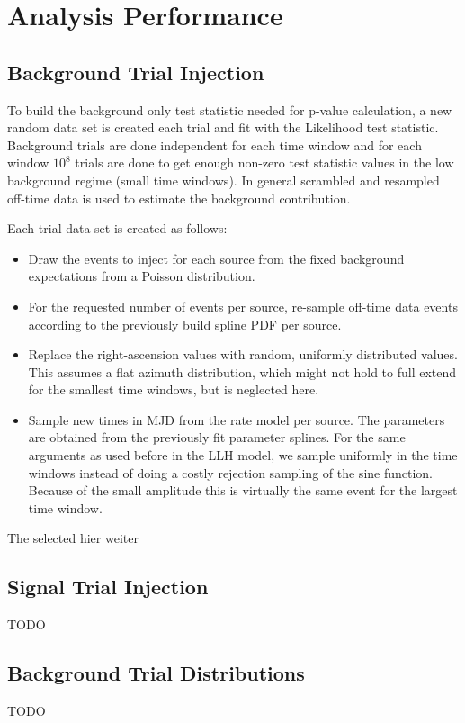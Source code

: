 \section{Analysis Performance}

\subsection{Background Trial Injection}
To build the background only test statistic needed for p-value calculation, a new random data set is created each trial and fit with the Likelihood test statistic.
Background trials are done independent for each time window and for each window $10^8$ trials are done to get enough non-zero test statistic values in the low background regime (small time windows).
In general scrambled and resampled off-time data is used to estimate the background contribution.

Each trial data set is created as follows:
\begin{itemize}
  \item Draw the events to inject for each source from the fixed background expectations from a Poisson distribution.
  \item For the requested number of events per source, re-sample off-time data events according to the previously build spline PDF per source.
  \item Replace the right-ascension values with random, uniformly distributed values.
  This assumes a flat azimuth distribution, which might not hold to full extend for the smallest time windows, but is neglected here.
  \item Sample new times in MJD from the rate model per source.
  The parameters are obtained from the previously fit parameter splines.
  For the same arguments as used before in the LLH model, we sample uniformly in the time windows instead of doing a costly rejection sampling of the sine function.
  Because of the small amplitude this is virtually the same event for the largest time window.
\end{itemize}

The selected \textcolor{nordred}{\huge hier weiter}

\subsection{Signal Trial Injection}
TODO

\subsection{Background Trial Distributions}
TODO

